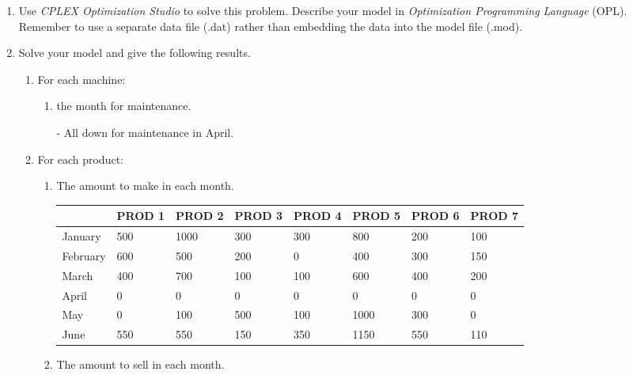 \documentclass[12pt,a4paper]{article}
\theoremstyle{definition}
\begin{document}
\begin{enumerate}
\item
Use \emph{CPLEX Optimization Studio} to solve this problem. Describe your model in \emph{Optimization Programming Language} (OPL). Remember to use a separate data file (.dat) rather than embedding the data into the model file (.mod).

\item
Solve your model and give the following results.
\begin{enumerate}
\item
For each machine:
\begin{enumerate}
\item
the month for maintenance.\par
- All down for maintenance in April.
\end{enumerate}
\item
For each product:
\begin{enumerate}
\item
The amount to make in each month.

	\scriptsize
	\renewcommand\arraystretch{1.1}
	\begin{tabular}{m{} m{}<{\centering} m{}<{\centering} m{}<{\centering} m{}<{\centering} m{}<{\centering} m{}<{\centering} m{}<{\centering}}
		\hline
		& \textbf{PROD 1} & \textbf{PROD 2} & \textbf{PROD 3} & \textbf{PROD 4} & \textbf{PROD 5} & \textbf{PROD 6} &  \textbf{PROD 7} \\\hline
		January & 500 & 1000 & 300 & 300 & 800 & 200 & 100 \\
		February & 600 & 500 & 200 & 0 & 400 & 300 & 150 \\
		March & 400 & 700 & 100 & 100 & 600 & 400 & 200 \\
		April & 0 & 0 & 0 & 0 & 0 & 0 & 0 \\
		May & 0 & 100 & 500 & 100 & 1000 & 300 & 0 \\
		June & 550 & 550 & 150 & 350 & 1150 & 550 & 110 \\
		\hline
	\end{tabular}

\item
The amount to sell in each month.


\end{enumerate}
\end{enumerate}
\end{enumerate}
\end{document}
